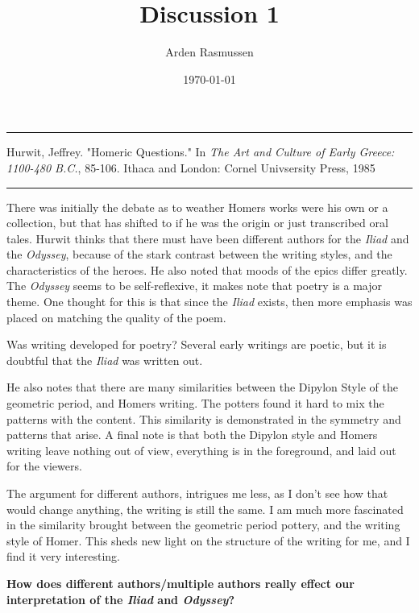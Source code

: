\documentclass[12pt]{amsart}
\title{Discussion 1}
\author{Arden Rasmussen}
\date{\today}
\begin{document}
\maketitle

\par\noindent\rule{\textwidth}{0.4pt}

\begin{hangparas}{.25in}{1}
  Hurwit, Jeffrey. "Homeric Questions." In \textit{The Art and Culture of Early
  Greece: 1100-480 B.C.}, 85-106. Ithaca and London: Cornel Univsersity Press,
  1985
\end{hangparas}

\par\noindent\rule{\textwidth}{0.4pt}

There was initially the debate as to weather Homers works were his own or a
collection, but that has shifted to if he was the origin or just transcribed
oral tales. Hurwit thinks that there must have been different authors for the
\textit{Iliad} and the \textit{Odyssey}, because of the stark contrast between
the writing styles, and the characteristics of the heroes. He also noted that
moods of the epics differ greatly.  The \textit{Odyssey} seems to be
self-reflexive, it makes note that poetry is a major theme. One thought for
this is that since the \textit{Iliad} exists, then more emphasis was placed on
matching the quality of the poem.

Was writing developed for poetry? Several early writings are poetic, but it is
doubtful that the \textit{Iliad} was written out.

He also notes that there are many similarities between the Dipylon Style of the
geometric period, and Homers writing. The potters found it hard to mix the
patterns with the content.  This similarity is demonstrated in the symmetry and
patterns that arise. A final note is that both the Dipylon style and Homers
writing leave nothing out of view, everything is in the foreground, and laid
out for the viewers.

The argument for different authors, intrigues me less, as I don't see how that
would change anything, the writing is still the same. I am much more fascinated
in the similarity brought between the geometric period pottery, and the
writing style of Homer. This sheds new light on the structure of the writing
for me, and I find it very interesting.

\textbf{How does different authors/multiple authors really effect our
interpretation of the \textit{Iliad} and \textit{Odyssey}?  }
\end{document}
